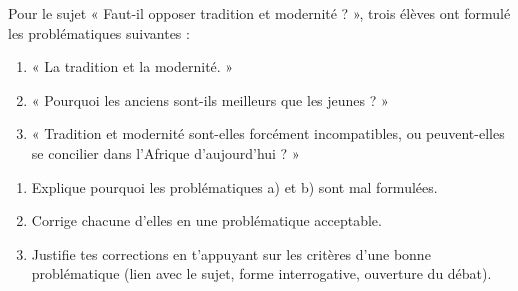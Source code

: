 \documentclass[11pt]{article}
\begin{document}
\begin{exercice}
Pour le sujet « Faut-il opposer tradition et modernité ? », trois élèves ont formulé les problématiques suivantes :
\begin{enumerate}
\item[a)] « La tradition et la modernité. »
\item[b)] « Pourquoi les anciens sont-ils meilleurs que les jeunes ? »
\item[c)] « Tradition et modernité sont-elles forcément incompatibles, ou peuvent-elles se concilier dans l'Afrique d'aujourd'hui ? »
\end{enumerate}
\begin{enumerate}
\item Explique pourquoi les problématiques a) et b) sont mal formulées.
\item Corrige chacune d'elles en une problématique acceptable.
\item Justifie tes corrections en t'appuyant sur les critères d'une bonne problématique (lien avec le sujet, forme interrogative, ouverture du débat).
\end{enumerate}
\end{exercice}
\end{document}
